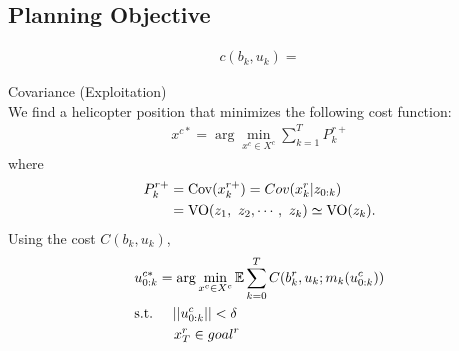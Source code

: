 \documentclass[conference]{IEEEtran}
\begin{document}
\subsection{Planning Objective}

\begin{align}
    c(b_k, u_k)=
\end{align}

Covariance (Exploitation)\\


We find a helicopter position that minimizes the following cost function:
\begin{align}
    x^{c*}=\arg\min_{x^c \in X^c} \sum^T_{k=1} P^{r+}_k
\end{align}
where
\begin{align}
P^{r+}_k&={\rm Cov}(x^{r+}_k) = Cov(x^{r}_k | z_{0:k})\\
&={\rm VO}(z_1,~z_2,\cdots,~z_k)\simeq {\rm VO}(z_k).
\end{align}
Using the cost $C(b_k, u_k)$,
\begin{align}
    &u^{c*}_{0:k}=\arg\min_{x^c \in X^c} \mathbb{E} \sum^T_{k=0} C(b^r_k, u_k; m_k (u^c_{0:k}))\\
    &{\rm s.t.} \hspace{5mm} ||u^c_{0:k}||< \delta\\
    &\hspace{10mm} x^r_T \in goal^r
\end{align}








\end{document}
